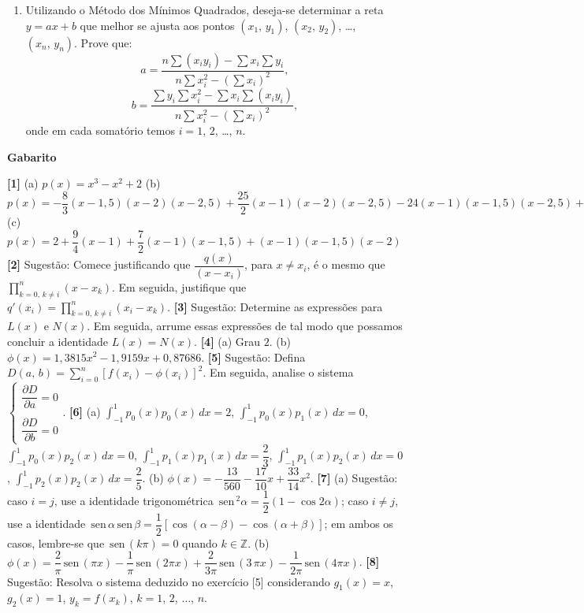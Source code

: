 \documentclass[12pt,a4paper]{article}
\newcommand{\sen}{\,\textrm{sen}\,}
\begin{document}
\begin{enumerate}
     \item Utilizando o Método dos Mínimos Quadrados, deseja-se determinar a reta $y = ax + b$ que 
melhor se ajusta aos pontos $(x_1,\,y_1)$, $(x_2,\,y_2)$, \ldots, $(x_n,\,y_n)$. Prove que:
$$a = \dfrac{\displaystyle n\sum (x_iy_i) - \sum x_i\sum y_i}{\displaystyle n\sum x_i^2 - \left(\sum x_i\right)^2},$$
$$b = \dfrac{\displaystyle \sum y_i\sum x_i^2 - \sum x_i\sum (x_iy_i)}{\displaystyle n\sum x_i^2 - \left(\sum x_i\right)^2},$$
onde em cada somatório temos $i = 1$, $2$, \ldots, $n$.

      \end{enumerate}
      
\begin{center}
\textbf{Gabarito}
\end{center} 
\textbf{[1]} (a) $p(x) = x^3 - x^2 + 2$ (b) $p(x) = -\dfrac{8}{3}(x-1,5)(x-2)(x-2,5) + \dfrac{25}{2}(x-1)(x-2)(x-2,5) 
- 24(x-1)(x-1,5)(x-2,5) + \dfrac{91}{6}(x-1)(x-1,5)(x-2)$ (c) $p(x) = 2 + \dfrac{9}{4}(x-1) + \dfrac{7}{2}(x-1)(x-1,5) + (x-1)(x-1,5)(x-2)$ 
\textbf{[2]} Sugestão: Comece justificando que $\dfrac{q(x)}{(x-x_i)}$, para $x\neq x_i$, é o mesmo que $\displaystyle\prod_{k=0,\,k\neq i}^n (x-x_k)$. Em seguida, 
justifique que $q'(x_i) = \displaystyle\prod_{k=0,\,k\neq i}^n (x_i-x_k)$. 
\textbf{[3]} Sugestão: Determine as expressões para $L(x)$ e $N(x)$. Em seguida, arrume essas expressões de tal modo que possamos concluir a identidade 
$L(x) = N(x)$. 
\textbf{[4]} (a) Grau $2$. (b) $\phi(x) = 1,3815x^2 - 1,9159x + 0,87686$. 
\textbf{[5]} Sugestão: Defina $\displaystyle D(a,\,b) = \sum_{i=0}^n \left[f(x_i) - \phi(x_i)\right]^2$. Em seguida, analise o sistema $\begin{cases}\dfrac{\partial D}{\partial a} = 0 \\ \\ \dfrac{\partial D}{\partial b} = 0\end{cases}$. 
\textbf{[6]} (a) $\displaystyle\int_{-1}^1 p_0(x)p_0(x)\,dx = 2$, $\displaystyle\int_{-1}^1 p_0(x)p_1(x)\,dx = 0$, \\ 
$\displaystyle\int_{-1}^1 p_0(x)p_2(x)\,dx = 0$,  $\displaystyle\int_{-1}^1 p_1(x)p_1(x)\,dx = \dfrac{2}{3}$, $\displaystyle\int_{-1}^1 p_1(x)p_2(x)\,dx = 0$, $\displaystyle\int_{-1}^1 p_2(x)p_2(x)\,dx = \dfrac{2}{5}$. 
(b) $\phi(x) = -\dfrac{13}{560} - \dfrac{17}{10}x + \dfrac{33}{14}x^2$. 
\textbf{[7]} (a) Sugestão: caso $i = j$, use a identidade 
trigonométrica $\sen^2 \alpha = \dfrac{1}{2}(1 - \cos 2\alpha)$; caso $i\neq j$, 
use a identidade $\sen \alpha\sen \beta = \dfrac{1}{2}[\cos(\alpha-\beta)-\cos(\alpha+\beta)]$; 
em ambos os casos, lembre-se que $\sen(k\pi) = 0$ quando $k\in \mathbb{Z}$. 
(b) $\phi(x) = \dfrac{2}{\pi}\sen\left(\pi x\right) - \dfrac{1}{\pi}\sen\left(2 \pi x\right) + \dfrac{2}{3\pi}\sen\left(3 \, \pi x\right) -\dfrac{1}{2\pi}\sen\left(4\pi x\right)$. 
\textbf{[8]} Sugestão: Resolva o sistema deduzido no exercício [5] considerando $g_1(x) = x$, $g_2(x) = 1$, $y_k = f(x_k)$, $k=1$, $2$, $\ldots$, $n$.
\end{document}
